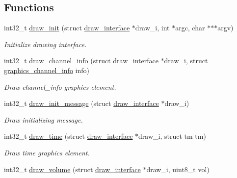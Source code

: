 \subsection*{Functions}
\begin{DoxyCompactItemize}
\item 
int32\+\_\+t \hyperlink{group__drawing_ga50526d5e4e244599996608371f410bf2}{draw\+\_\+init} (struct \hyperlink{structdraw__interface}{draw\+\_\+interface} $\ast$draw\+\_\+i, int $\ast$argc, char $\ast$$\ast$$\ast$argv)\hypertarget{group__drawing_ga50526d5e4e244599996608371f410bf2}{}\label{group__drawing_ga50526d5e4e244599996608371f410bf2}

\begin{DoxyCompactList}\small\item\em Initialize drawing interface. \end{DoxyCompactList}\item 
int32\+\_\+t \hyperlink{group__drawing_ga71818ed76471623e9aeffe07a0ba26d2}{draw\+\_\+channel\+\_\+info} (struct \hyperlink{structdraw__interface}{draw\+\_\+interface} $\ast$draw\+\_\+i, struct \hyperlink{structgraphics__channel__info}{graphics\+\_\+channel\+\_\+info} info)\hypertarget{group__drawing_ga71818ed76471623e9aeffe07a0ba26d2}{}\label{group__drawing_ga71818ed76471623e9aeffe07a0ba26d2}

\begin{DoxyCompactList}\small\item\em Draw channel\+\_\+info graphics element. \end{DoxyCompactList}\item 
int32\+\_\+t \hyperlink{group__drawing_ga37e840145ddb9107f2efbec80697e377}{draw\+\_\+init\+\_\+message} (struct \hyperlink{structdraw__interface}{draw\+\_\+interface} $\ast$draw\+\_\+i)\hypertarget{group__drawing_ga37e840145ddb9107f2efbec80697e377}{}\label{group__drawing_ga37e840145ddb9107f2efbec80697e377}

\begin{DoxyCompactList}\small\item\em Draw initializing message. \end{DoxyCompactList}\item 
int32\+\_\+t \hyperlink{group__drawing_gaa19821a33379a186117efe18a67bfea7}{draw\+\_\+time} (struct \hyperlink{structdraw__interface}{draw\+\_\+interface} $\ast$draw\+\_\+i, struct tm tm)\hypertarget{group__drawing_gaa19821a33379a186117efe18a67bfea7}{}\label{group__drawing_gaa19821a33379a186117efe18a67bfea7}

\begin{DoxyCompactList}\small\item\em Draw time graphics element. \end{DoxyCompactList}\item 
int32\+\_\+t \hyperlink{group__drawing_gae31d79c9ff070efa64603736bee4d252}{draw\+\_\+volume} (struct \hyperlink{structdraw__interface}{draw\+\_\+interface} $\ast$draw\+\_\+i, uint8\+\_\+t vol)\hypertarget{group__drawing_gae31d79c9ff070efa64603736bee4d252}{}\label{group__drawing_gae31d79c9ff070efa64603736bee4d252}


\end{DoxyCompactItemize}
